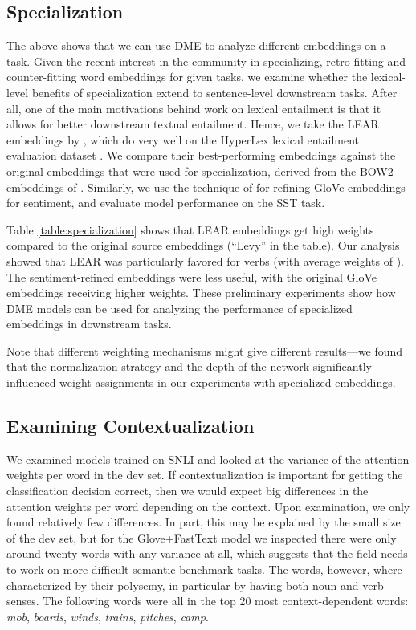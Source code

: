 \documentclass[11pt,a4paper]{article}
\begin{document}
\subsection{Specialization}

The above shows that we can use DME to analyze different embeddings on a task. Given the recent interest in the community in specializing, retro-fitting and counter-fitting word embeddings for given tasks, we examine whether the lexical-level benefits of specialization extend to sentence-level downstream tasks. After all, one of the main motivations behind work on lexical entailment is that it allows for better downstream textual entailment. Hence, we take the LEAR embeddings by , which do very well on the HyperLex lexical entailment evaluation dataset \cite{Vulic:2017cl}. We compare their best-performing embeddings against the original embeddings that were used for specialization, derived from the BOW2 embeddings of . Similarly, we use the technique of  for refining GloVe embeddings for sentiment, and evaluate model performance on the SST task.

Table \ref{table:specialization} shows that LEAR embeddings get high weights compared to the original source embeddings (``Levy'' in the table). Our analysis showed that LEAR was particularly favored for verbs (with average weights of ). The sentiment-refined embeddings were less useful, with the original GloVe embeddings receiving higher weights. These preliminary experiments show how DME models can be used for analyzing the performance of specialized embeddings in downstream tasks.

Note that different weighting mechanisms might give different results---we found that the normalization strategy and the depth of the network significantly influenced weight assignments in our experiments with specialized embeddings.

\subsection{Examining Contextualization}

We examined models trained on SNLI and looked at the variance of the attention weights per word in the dev set. If contextualization is important for getting the classification decision correct, then we would expect big differences in the attention weights per word depending on the context. Upon examination, we only found relatively few differences. In part, this may be explained by the small size of the dev set, but for the Glove+FastText model we inspected there were only around twenty words with any variance at all, which suggests that the field needs to work on more difficult semantic benchmark tasks. The words, however, where characterized by their polysemy, in particular by having both noun and verb senses. The following words were all in the top 20 most context-dependent words: \emph{mob}, \emph{boards}, \emph{winds}, \emph{trains}, \emph{pitches}, \emph{camp}.
\end{document}
